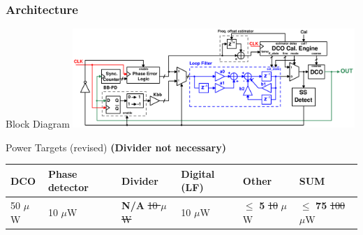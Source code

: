 \documentclass[t, screen, aspectratio=43]{beamer}
\begin{document}
\begin{frame}
	\frametitle{Architecture}
	\begin{block}{Block Diagram}
	\center\includegraphics[width=0.8\textwidth, angle=0]{pll_master_arch.pdf}

	\end{block}
		\begin{block}{Power Targets {\color{red}(revised)}}
		\scriptsize
		{\color{red}\textbf{(Divider not necessary)}}
		\vspace{-1em}
		\begin{table}[htb!]
			\tiny
			\centering
			\def\arraystretch{1.5}		
			\setlength\arrayrulewidth{0.75pt}
			\setlength{\tabcolsep}{1em} %
			\begin{tabular}{|l|l|l|l|l|l|}
				\hline 
				\rule[-1ex]{0pt}{2.5ex} \cellcolor{gray!40}\textbf{DCO} & \cellcolor{gray!40}\textbf{Phase detector} & \cellcolor{gray!40}\textbf{Divider }& \cellcolor{gray!40}\textbf{Digital (LF)}& \cellcolor{gray!40}\textbf{Other} & \cellcolor{gray!40}\textbf{SUM} \\ 
				\hline 
				\rule[-1ex]{0pt}{2.5ex} 50 $\mu$W& 10 $\mu$W & \textbf{N/A} {\color{red}\st{10 $\mu$W}} & 10 $\mu$W  & $\leq$ \textbf{5} {\color{red}\st{10}} $ \mu$W & $\leq$ \textbf{75} {\color{red}\st{100}} $\mu$W\\ 
				\hline 
			\end{tabular} 
		\end{table}   
	\end{block}

\end{frame}

\end{document}
